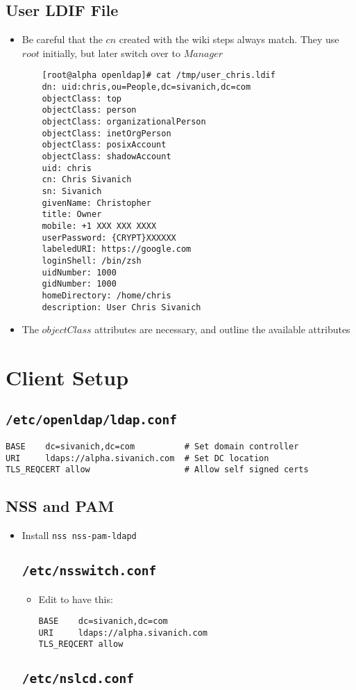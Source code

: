 \documentclass{article}
\begin{document}
    \subsection{User LDIF File}
    \begin{itemize}
        \item Be careful that the $cn$ created with the wiki steps always match. They use $root$ initially, but later switch over to $Manager$
            \begin{verbatim}
    [root@alpha openldap]# cat /tmp/user_chris.ldif 
    dn: uid:chris,ou=People,dc=sivanich,dc=com
    objectClass: top
    objectClass: person
    objectClass: organizationalPerson
    objectClass: inetOrgPerson
    objectClass: posixAccount
    objectClass: shadowAccount
    uid: chris
    cn: Chris Sivanich
    sn: Sivanich
    givenName: Christopher
    title: Owner
    mobile: +1 XXX XXX XXXX
    userPassword: {CRYPT}XXXXXX
    labeledURI: https://google.com
    loginShell: /bin/zsh
    uidNumber: 1000
    gidNumber: 1000
    homeDirectory: /home/chris
    description: User Chris Sivanich
    \end{verbatim}
\item The $objectClass$ attributes are necessary, and outline the available attributes
\end{itemize}

\section{Client Setup}
\subsection{\texttt{/etc/openldap/ldap.conf}}
\begin{verbatim}
BASE    dc=sivanich,dc=com          # Set domain controller
URI     ldaps://alpha.sivanich.com  # Set DC location
TLS_REQCERT allow                   # Allow self signed certs
\end{verbatim}
\subsection{NSS and PAM}
\begin{itemize}
    \item Install \texttt{nss nss-pam-ldapd}
        \subsection{\texttt{/etc/nsswitch.conf}}
        \begin{itemize}
            \item Edit to have this:
                \begin{verbatim}
BASE    dc=sivanich,dc=com
URI     ldaps://alpha.sivanich.com
TLS_REQCERT allow
                \end{verbatim}
        \end{itemize}
        \subsection{\texttt{/etc/nslcd.conf}}
\end{itemize}
\end{document}
